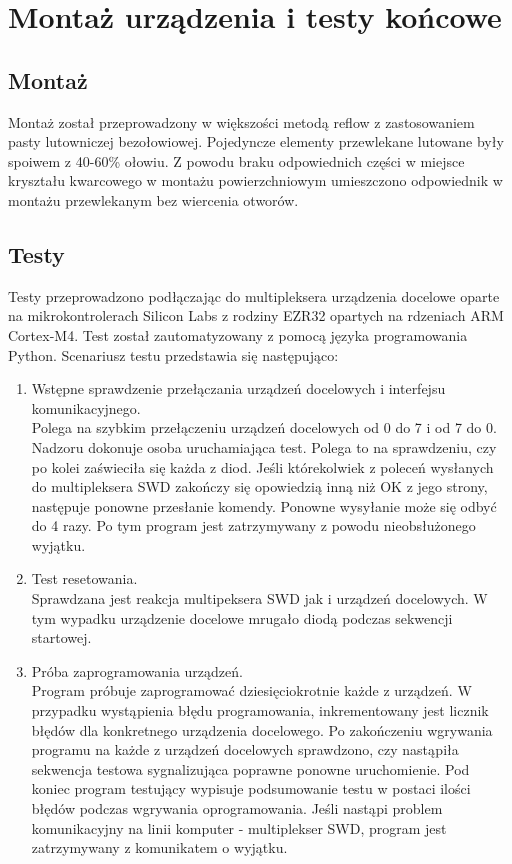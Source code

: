 \chapter{Montaż urządzenia i testy końcowe}

\section{Montaż}
Montaż został przeprowadzony w większości metodą reflow z zastosowaniem pasty lutowniczej bezołowiowej. Pojedyncze elementy przewlekane lutowane były spoiwem z 40-60\% ołowiu. Z powodu braku odpowiednich części w miejsce kryształu kwarcowego w montażu powierzchniowym umieszczono odpowiednik w montażu przewlekanym bez wiercenia otworów.

\section{Testy}
Testy przeprowadzono podłączając do multipleksera urządzenia docelowe oparte na mikrokontrolerach Silicon Labs z rodziny EZR32 opartych na rdzeniach ARM Cortex-M4. 
Test został zautomatyzowany z pomocą języka programowania Python.
Scenariusz testu przedstawia się następująco:
\begin{enumerate}
    \item Wstępne sprawdzenie przełączania urządzeń docelowych i interfejsu komunikacyjnego.\\ 
    Polega na szybkim przełączeniu urządzeń docelowych od 0 do 7 i od 7 do 0. Nadzoru dokonuje osoba uruchamiająca test. Polega to na sprawdzeniu, czy po kolei zaświeciła się każda z diod. Jeśli którekolwiek z poleceń wysłanych do multipleksera SWD zakończy się opowiedzią inną niż OK z jego strony, następuje ponowne przesłanie komendy. Ponowne wysyłanie może się odbyć do 4 razy. Po tym program jest zatrzymywany z powodu nieobsłużonego wyjątku.
    \item Test resetowania.\\
    Sprawdzana jest reakcja multipeksera SWD jak i urządzeń docelowych. W tym wypadku urządzenie docelowe mrugało diodą podczas sekwencji startowej.
    \item Próba zaprogramowania urządzeń.\\
    Program próbuje zaprogramować dziesięciokrotnie każde z urządzeń. W przypadku wystąpienia błędu programowania, inkrementowany jest licznik błędów dla konkretnego urządzenia docelowego. Po zakończeniu wgrywania programu na każde z urządzeń docelowych sprawdzono, czy nastąpiła sekwencja testowa sygnalizująca poprawne ponowne uruchomienie. Pod koniec program testujący wypisuje podsumowanie testu w postaci ilości błędów podczas wgrywania oprogramowania. Jeśli nastąpi problem komunikacyjny na linii komputer - multiplekser SWD, program jest zatrzymywany z komunikatem o wyjątku.
\end{enumerate}

